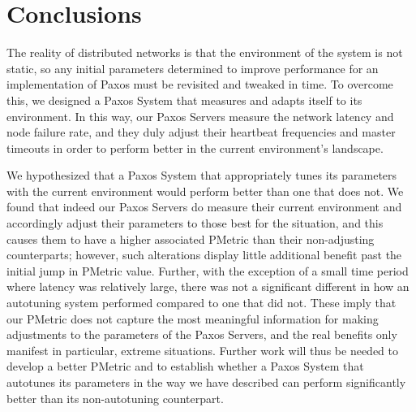 
\section{Conclusions}
The reality of distributed networks is that the environment of the system is not static, so any initial parameters determined to improve performance for an implementation of Paxos must be revisited and tweaked in time.  To overcome this, we designed a Paxos System that measures and adapts itself to its environment.  In this way, our Paxos Servers measure the network latency and node failure rate, and they duly adjust their heartbeat frequencies and master timeouts in order to perform better in the current environment's landscape.

We hypothesized that a Paxos System that appropriately tunes its parameters with the current environment would perform better than one that does not.  We found that indeed our Paxos Servers do measure their current environment and accordingly adjust their parameters to those best for the situation, and this causes them to have  a higher associated PMetric than their non-adjusting counterparts; however, such alterations display little additional benefit past the initial jump in PMetric value.  Further, with the exception of a small time period where latency was relatively large, there was not a significant different in how an autotuning system performed compared to one that did not.  These imply that our PMetric does not capture the most meaningful information for making adjustments to the parameters of the Paxos Servers, and the real benefits only manifest in particular, extreme situations.  Further work will thus be needed to develop a better PMetric and to establish whether a Paxos System that autotunes its parameters in the way we have described can perform significantly better than its non-autotuning counterpart.